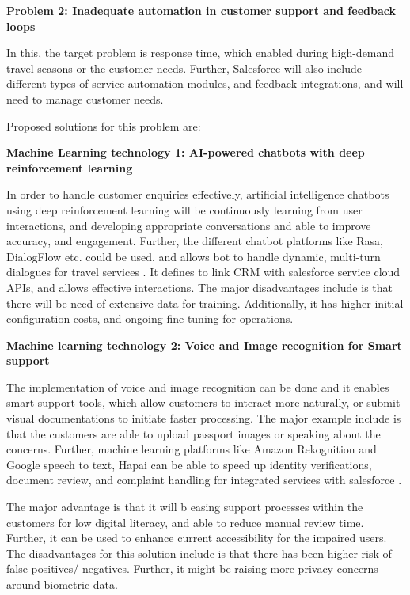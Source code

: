 \documentclass{article}
\begin{document}
\textbf{Problem 2: Inadequate automation in customer support and feedback loops}

In this, the target problem is response time, which enabled during high-demand travel seasons or the customer needs. Further, Salesforce will also include different types of service automation modules, and feedback integrations, and will need to manage customer needs. 

Proposed solutions for this problem are:

\textbf{Machine Learning technology 1: AI-powered chatbots with deep reinforcement learning}

In order to handle customer enquiries effectively, artificial intelligence chatbots using deep reinforcement learning will be continuously learning from user interactions, and developing appropriate conversations and able to improve accuracy, and engagement. Further, the different chatbot platforms like Rasa, DialogFlow etc. could be used, and allows bot to handle dynamic, multi-turn dialogues for travel services \cite{cuayahuitl_ensemble-based_2019}. It defines to link CRM with salesforce service cloud APIs, and allows effective interactions. The major disadvantages include is that there will be need of extensive data for training. Additionally, it has higher initial configuration costs, and ongoing fine-tuning for operations. 

\textbf{Machine learning technology 2: Voice and Image recognition for Smart support}

The implementation of voice and image recognition can be done and it enables smart support tools, which allow customers to interact more naturally, or submit visual documentations to initiate faster processing. The major example include is that the customers are able to upload passport images or speaking about the concerns. Further, machine learning platforms like Amazon Rekognition and Google speech to text, Hapai can be able to speed up identity verifications, document review, and complaint handling for integrated services with salesforce \cite{liu_retracted_2025}. 

The major advantage is that it will b easing support processes within the customers for low digital literacy, and able to reduce manual review time. Further, it can be used to enhance current accessibility for the impaired users. The disadvantages for this solution include is that there has been higher risk of false positives/ negatives. Further, it might be raising more privacy concerns around biometric data. 
\end{document}
